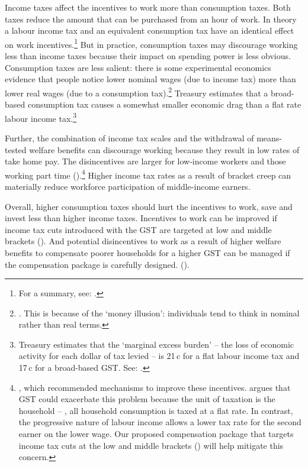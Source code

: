 Income taxes affect the incentives to work more than consumption taxes. Both taxes reduce the amount that can be purchased from an hour of work. In theory a labour income tax and an equivalent consumption tax have an identical effect on work incentives.\footnote{For a summary, see: \textcite[][458]{McCaffry2008}.}  But in practice, consumption taxes may discourage working less than income taxes because their impact on spending power is less obvious. Consumption taxes are less salient: there is some experimental economics evidence that people notice lower nominal wages (due to income tax) more than lower real wages (due to a consumption tax).\footnote{\textcites{BlumkinRuffleGanun2012}{SausgruberTyran2005}. This is because of the ‘money illusion’: individuals tend to think in nominal rather than real terms.}  Treasury estimates that a broad-based consumption tax causes a somewhat smaller economic drag than a flat rate labour income tax.\footnote{Treasury estimates that the ‘marginal excess burden’ – the loss of economic activity for each dollar of tax levied – is 21\,c for a flat labour income tax and 17\,c for a broad-based GST\@. See: \textcite[][25]{Treasury2015ReThink}.}  

Further, the combination of income tax scales and the withdrawal of means-tested welfare benefits can discourage working because they result in low rates of take home pay. The disincentives are larger for low-income workers and those working part time ().\footnote{\textcites{ProductivityCommission2015-Tax-and-transfer-incidence}{HardingNguVuPayneEtAl2009}{Reference-Group-On-Welfare-Reform-to-the-Minister-for-Social-Services-2015}, 
which recommended mechanisms to improve these incentives. \textcite{Apps2015} argues that GST could exacerbate this problem because the unit of taxation is the household – \ie, all household consumption is taxed at a flat rate. In contrast, the progressive nature of labour income allows a lower tax rate for the second earner on the lower wage. Our proposed compensation package that targets income tax cuts at the low and middle brackets () will help mitigate this concern.}  Higher income tax rates as a result of bracket creep can materially reduce workforce participation of middle-income earners.  

Overall, higher consumption taxes should hurt the incentives to work, save and invest less than higher income taxes. Incentives to work can be improved if income tax cuts introduced with the GST are targeted at low and middle brackets (). And potential disincentives to work as a result of higher welfare benefits to compensate poorer households for a higher GST can be managed if the compensation package is carefully designed. (). 

